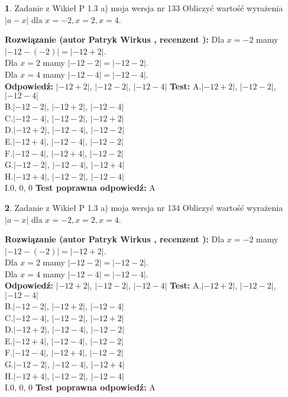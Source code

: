 \documentclass[12pt, a4paper]{article}
\theoremstyle{definition} %
\newtheorem{zad}{}
\newcommand{\zadStart}[1]{\begin{zad}#1\newline}
\newcommand{\zadStop}{\end{zad}}
\newcommand{\rozwStart}[2]{\noindent \textbf{Rozwiązanie (autor #1 , recenzent #2): }\newline}
\newcommand{\rozwStop}{\newline}
\newcommand{\odpStart}{\noindent \textbf{Odpowiedź:}\newline}
\newcommand{\odpStop}{\newline}
\newcommand{\testStart}{\noindent \textbf{Test:}\newline}
\newcommand{\testStop}{\newline}
\newcommand{\kluczStart}{\noindent \textbf{Test poprawna odpowiedź:}\newline}
\newcommand{\kluczStop}{\newline}
\begin{document}
\zadStart{Zadanie z Wikieł P 1.3 a) moja wersja nr 133}
Obliczyć wartość wyrażenia $|a - x|$ dla $x=-2,x=2,x=4$.
\zadStop
\rozwStart{Patryk Wirkus}{}
Dla $x = -2$ mamy $|-12 - (-2)| = |-12 + 2|$.\\
Dla $x = 2$ mamy $|-12 - 2| = |-12 - 2|$.\\
Dla $x = 4$ mamy $|-12 - 4| = |-12 - 4|$.\\
\rozwStop
\odpStart
$|-12 + 2|$, $|-12 - 2|$, $|-12 - 4|$
\odpStop
\testStart
A.$|-12 + 2|$, $|-12 - 2|$, $|-12 - 4|$\\
B.$|-12 - 2|$, $|-12 + 2|$, $|-12 - 4|$\\
C.$|-12 - 4|$, $|-12 - 2|$, $|-12 + 2|$\\
D.$|-12 + 2|$, $|-12 - 4|$, $|-12 - 2|$\\
E.$|-12 + 4|$, $|-12 - 4|$, $|-12 - 2|$\\
F.$|-12 - 4|$, $|-12 + 4|$, $|-12 - 2|$\\
G.$|-12 - 2|$, $|-12 - 4|$, $|-12 + 4|$\\
H.$|-12 + 4|$, $|-12 - 2|$, $|-12 - 4|$\\
I.$0$, $0$, $0$
\testStop
\kluczStart
A
\kluczStop



\zadStart{Zadanie z Wikieł P 1.3 a) moja wersja nr 134}
Obliczyć wartość wyrażenia $|a - x|$ dla $x=-2,x=2,x=4$.
\zadStop
\rozwStart{Patryk Wirkus}{}
Dla $x = -2$ mamy $|-12 - (-2)| = |-12 + 2|$.\\
Dla $x = 2$ mamy $|-12 - 2| = |-12 - 2|$.\\
Dla $x = 4$ mamy $|-12 - 4| = |-12 - 4|$.\\
\rozwStop
\odpStart
$|-12 + 2|$, $|-12 - 2|$, $|-12 - 4|$
\odpStop
\testStart
A.$|-12 + 2|$, $|-12 - 2|$, $|-12 - 4|$\\
B.$|-12 - 2|$, $|-12 + 2|$, $|-12 - 4|$\\
C.$|-12 - 4|$, $|-12 - 2|$, $|-12 + 2|$\\
D.$|-12 + 2|$, $|-12 - 4|$, $|-12 - 2|$\\
E.$|-12 + 4|$, $|-12 - 4|$, $|-12 - 2|$\\
F.$|-12 - 4|$, $|-12 + 4|$, $|-12 - 2|$\\
G.$|-12 - 2|$, $|-12 - 4|$, $|-12 + 4|$\\
H.$|-12 + 4|$, $|-12 - 2|$, $|-12 - 4|$\\
I.$0$, $0$, $0$
\testStop
\kluczStart
A
\kluczStop
\end{document}

